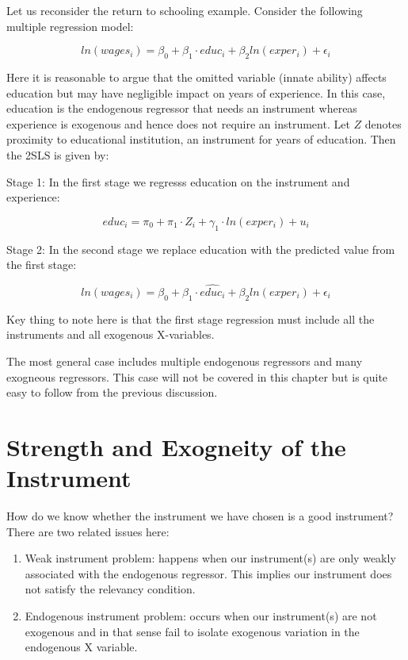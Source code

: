 \documentclass[
]{book}
\newenvironment{Shaded}{\begin{snugshade}}{\end{snugshade}}
\newcommand{\NormalTok}[1]{#1}
\theoremstyle{definition}
\theoremstyle{definition}
\theoremstyle{definition}
\theoremstyle{definition}
\theoremstyle{remark}
\begin{document}
Let us reconsider the return to schooling example. Consider the following multiple regression model:

\[ln(wages_i)=\beta_0+\beta_1\cdot educ_i +\beta_2 ln(exper_i)+\epsilon_i\]

Here it is reasonable to argue that the omitted variable (innate ability) affects education but may have negligible impact on years of experience. In this case, education is the endogenous regressor that needs an instrument whereas experience is exogenous and hence does not require an instrument. Let \(Z\) denotes proximity to educational institution, an instrument for years of education. Then the 2SLS is given by:

Stage 1: In the first stage we regresss education on the instrument and experience:

\[educ_i=\pi_0+\pi_1\cdot Z_i +\gamma_1\cdot ln(exper_i)+u_i\]

Stage 2: In the second stage we replace education with the predicted value from the first stage:

\[ln(wages_i)=\beta_0+\beta_1\cdot \widehat{educ_i} +\beta_2 ln(exper_i)+\epsilon_i\]

\begin{Shaded}
\begin{Highlighting}[]
\NormalTok{Key thing to note here is that the first stage regression must include all the instruments and all exogenous X{-}variables.}
\end{Highlighting}
\end{Shaded}

The most general case includes multiple endogenous regressors and many exogneous regressors. This case will not be covered in this chapter but is quite easy to follow from the previous discussion.

\hypertarget{strength-and-exogneity-of-the-instrument}{%
\section{Strength and Exogneity of the Instrument}\label{strength-and-exogneity-of-the-instrument}}

How do we know whether the instrument we have chosen is a good instrument? There are two related issues here:

\begin{enumerate}
\def\labelenumi{\arabic{enumi}.}
\item
  Weak instrument problem: happens when our instrument(s) are only weakly associated with the endogenous regressor. This implies our instrument does not satisfy the relevancy condition.
\item
  Endogenous instrument problem: occurs when our instrument(s) are not exogenous and in that sense fail to isolate exogenous variation in the endogenous X variable.
\end{enumerate}
\end{document}
